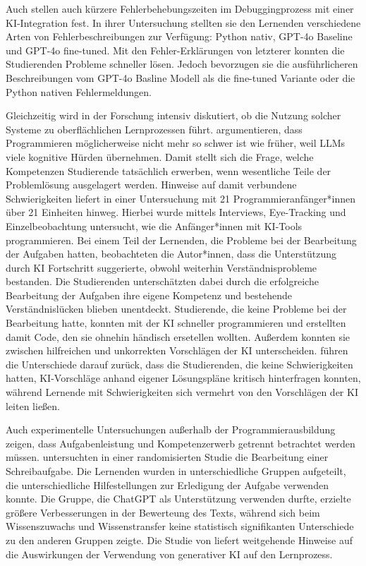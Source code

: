 Auch \textcite[S.~S.1]{santos_its_2025} stellen auch kürzere Fehlerbehebungszeiten im Debuggingprozess mit einer KI-Integration fest. In ihrer Untersuchung stellten sie den Lernenden verschiedene Arten von Fehlerbeschreibungen zur Verfügung: Python nativ, GPT-4o Baseline und GPT-4o fine-tuned. Mit den Fehler-Erklärungen von letzterer konnten die Studierenden Probleme schneller lösen. Jedoch bevorzugen sie die ausführlicheren Beschreibungen vom GPT-4o Basline Modell als die fine-tuned Variante oder die Python nativen Fehlermeldungen.

Gleichzeitig wird in der Forschung intensiv diskutiert, ob die Nutzung solcher Systeme zu oberflächlichen Lernprozessen führt. \textcite[S.~1]{BeckerProgrammingHard} argumentieren, dass Programmieren möglicherweise nicht mehr so schwer ist wie früher, weil LLMs viele kognitive Hürden übernehmen. Damit stellt sich die Frage, welche Kompetenzen Studierende tatsächlich erwerben, wenn wesentliche Teile der Problemlösung ausgelagert werden. Hinweise auf damit verbundene Schwierigkeiten liefert \textcite[S.~484]{prather_widening_2024} in einer Untersuchung mit 21 Programmieranfänger*innen über 21 Einheiten hinweg. Hierbei wurde mittels Interviews, Eye-Tracking und Einzelbeobachtung untersucht, wie die Anfänger*innen mit KI-Tools programmieren. Bei einem Teil der Lernenden, die Probleme bei der Bearbeitung der Aufgaben hatten, beobachteten die Autor*innen, dass die Unterstützung durch KI Fortschritt suggerierte, obwohl weiterhin Verständnisprobleme bestanden. Die Studierenden unterschätzten dabei durch die erfolgreiche Bearbeitung der Aufgaben ihre eigene Kompetenz und bestehende Verständnislücken blieben unentdeckt. Studierende, die keine Probleme bei der Bearbeitung hatte, konnten mit der KI schneller programmieren und erstellten damit Code, den sie ohnehin händisch ersetellen wollten. Außerdem konnten sie zwischen hilfreichen und unkorrekten Vorschlägen der KI unterscheiden. \textcite[S.~482-484]{prather_widening_2024} führen die Unterschiede darauf zurück, dass die Studierenden, die keine Schwierigkeiten hatten, KI-Vorschläge anhand eigener Lösungspläne kritisch hinterfragen konnten, während Lernende mit Schwierigkeiten sich vermehrt von den Vorschlägen der KI leiten ließen.

Auch experimentelle Untersuchungen außerhalb der Programmierausbildung zeigen, dass Aufgabenleistung und Kompetenzerwerb getrennt betrachtet werden müssen. \textcite[S.~1-3]{fan_beware_2025} untersuchten in einer randomisierten Studie die Bearbeitung einer Schreibaufgabe. Die Lernenden wurden in unterschiedliche Gruppen aufgeteilt, die unterschiedliche Hilfestellungen zur Erledigung der Aufgabe verwenden konnte. Die Gruppe, die ChatGPT als Unterstützung verwenden durfte, erzielte größere Verbesserungen in der Bewerteung des Texts, während sich beim Wissenszuwachs und Wissenstransfer keine statistisch signifikanten Unterschiede zu den anderen Gruppen zeigte. Die Studie von \textcite[S.~1]{bastani_generative_2025} liefert weitgehende Hinweise auf die Auswirkungen der Verwendung von generativer KI auf den Lernprozess.

